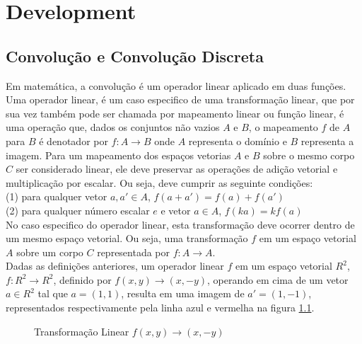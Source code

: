 \chapter{Development}

\section{Convolução e Convolução Discreta}
Em matemática, a convolução é um operador linear aplicado em duas funções. 
Uma operador linear, é um caso especifico de uma transformação linear, que por sua vez também pode ser chamada por mapeamento linear ou função linear, é uma operação que, dados os conjuntos não vazios $A$ e $B$, o mapeamento $f$ de $A$ para $B$ é denotador por $f : A \to B$ onde $A$ representa o domínio e $B$ representa a imagem.
Para um mapeamento dos espaços vetorias $A$ e $B$ sobre o mesmo corpo $C$ ser considerado linear, ele deve preservar as operações de adição vetorial e multiplicação por escalar. 
Ou seja, deve cumprir as seguinte condições:\\
(1) para qualquer vetor $a, a' \in A$, $f(a+a') = f(a) + f(a')$\\
(2) para qualquer número escalar $e$ e vetor $a \in A$, $f(ka) = kf(a)$\\
No caso especifico do operador linear, esta transformação deve ocorrer dentro de um mesmo espaço vetorial.
Ou seja, uma transformação $f$ em um espaço vetorial $A$ sobre um corpo $C$ representada por $f : A \to A$.
\citep{lipschutz2009linear} \\%
Dadas as definições anteriores, um operador linear $f$ em um espaço vetorial $R^2$, $f : R^2 \to R^2$, definido por $f(x,y) \to (x,-y)$, operando em cima de um vetor $a \in R^2$ tal que $a = (1,1)$, resulta em uma imagem de $a' = (1,-1)$, representados respectivamente pela linha azul e vermelha na figura \ref{fig:operacaolinear}.
\begin{figure}[h] 
  \centering
  \caption[Transformação Linear $f(x,y) \to (x,-y)$]{Transformação Linear $f(x,y) \to (x,-y)$}
    \label{fig:operacaolinear}
\end{figure}

